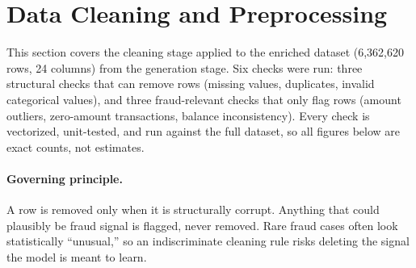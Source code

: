 %

\section{Data Cleaning and Preprocessing}

This section covers the cleaning stage applied to the enriched dataset (6,362,620 rows, 24 columns) from the generation stage. Six checks were run: three structural checks that can remove rows (missing values, duplicates, invalid categorical values), and three fraud-relevant checks that only flag rows (amount outliers, zero-amount transactions, balance inconsistency). Every check is vectorized, unit-tested, and run against the full dataset, so all figures below are exact counts, not estimates.

\paragraph{Governing principle.} A row is removed only when it is structurally corrupt. Anything that could plausibly be fraud signal is flagged, never removed. Rare fraud cases often look statistically ``unusual,'' so an indiscriminate cleaning rule risks deleting the signal the model is meant to learn.

